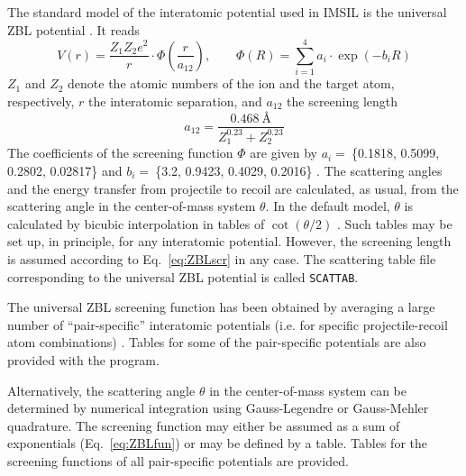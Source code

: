 The standard model of the interatomic potential used in IMSIL is the 
universal ZBL potential \cite{I8512}. It reads 
%
\begin{equation}
   V(r) = \frac{Z_1 Z_2 e^2}{r} \cdot \Phi(\frac{r}{a_{12}}), \qquad
   \Phi(R) = \sum_{i=1}^4 a_i \cdot \exp(-b_i R)
   \label{eq:ZBLfun}
\end{equation}
%
$Z_1$ and $Z_2$ denote the atomic numbers of the ion and the target atom, 
respectively, $r$ the interatomic separation, and $a_{12}$ the screening length
%
\begin{equation}
   a_{12} = \frac{0.468~\mbox{\AA}}{Z_1^{0.23} + Z_2^{0.23}}
   \label{eq:ZBLscr}
\end{equation}
%
The coefficients of the screening function $\Phi$ are given by 
$a_i =~$\{0.1818, 0.5099, 0.2802, 0.02817\} and   
$b_i =~$\{3.2,    0.9423, 0.4029, 0.2016\} \cite{I8512}. The scattering angles
and the energy transfer from projectile to recoil are calculated, as usual, from
the scattering angle in the center-of-mass system $\theta$. In the default
model, $\theta$ is calculated by bicubic interpolation in tables of
$\cot(\theta/2)$ \cite{I8730}. Such tables may be set up, in principle, for any
interatomic potential. However, the screening length is assumed according to
Eq.~\ref{eq:ZBLscr} in any case. The scattering table file corresponding to the
universal ZBL potential is called \texttt{SCATTAB}.

The universal ZBL screening function has been obtained by averaging a large 
number of ``pair-specific'' interatomic potentials (i.e. for specific
projectile-recoil atom combinations) \cite{I8512}. Tables for some of the
pair-specific potentials are also provided with the program.

Alternatively, the scattering angle $\theta$ in the center-of-mass system can be 
determined by numerical integration using Gauss-Legendre or Gauss-Mehler
quadrature. The screening function may either be assumed as a sum of
exponentials (Eq.~\ref{eq:ZBLfun}) or may be defined by a table. Tables for the
screening functions of all pair-specific potentials are provided.

